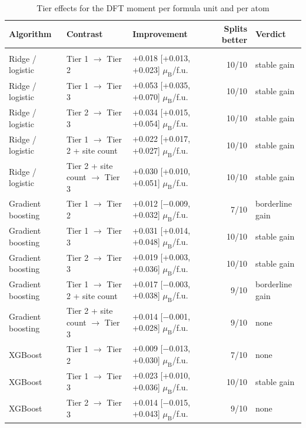 \begin{table}
\caption{Tier effects for the DFT moment per formula unit and per atom}
\label{tab:tableS8_moment_per_fu}
\tablefont
\begin{tabularx}{\textwidth}{@{}>{\raggedright\arraybackslash}Xllrl@{}}
\toprule
\textbf{Algorithm} & \textbf{Contrast} & \textbf{Improvement} & \textbf{Splits better} & \textbf{Verdict} \\
\midrule
\multicolumn{5}{@{}l@{}}{\textit{per formula unit, all}} \\
\quad Ridge / logistic & Tier 1 $\rightarrow$ Tier 2 & +0.018 [+0.013, +0.023] $\mu_\mathrm{B}$/f.u. & 10/10 & stable gain \\
\quad Ridge / logistic & Tier 1 $\rightarrow$ Tier 3 & +0.053 [+0.035, +0.070] $\mu_\mathrm{B}$/f.u. & 10/10 & stable gain \\
\quad Ridge / logistic & Tier 2 $\rightarrow$ Tier 3 & +0.034 [+0.015, +0.054] $\mu_\mathrm{B}$/f.u. & 10/10 & stable gain \\
\quad Ridge / logistic & Tier 1 $\rightarrow$ Tier 2 + site count & +0.022 [+0.017, +0.027] $\mu_\mathrm{B}$/f.u. & 10/10 & stable gain \\
\quad Ridge / logistic & Tier 2 + site count $\rightarrow$ Tier 3 & +0.030 [+0.010, +0.051] $\mu_\mathrm{B}$/f.u. & 10/10 & stable gain \\
\quad Gradient boosting & Tier 1 $\rightarrow$ Tier 2 & +0.012 [$-$0.009, +0.032] $\mu_\mathrm{B}$/f.u. & 7/10 & borderline gain \\
\quad Gradient boosting & Tier 1 $\rightarrow$ Tier 3 & +0.031 [+0.014, +0.048] $\mu_\mathrm{B}$/f.u. & 10/10 & stable gain \\
\quad Gradient boosting & Tier 2 $\rightarrow$ Tier 3 & +0.019 [+0.003, +0.036] $\mu_\mathrm{B}$/f.u. & 10/10 & stable gain \\
\quad Gradient boosting & Tier 1 $\rightarrow$ Tier 2 + site count & +0.017 [$-$0.003, +0.038] $\mu_\mathrm{B}$/f.u. & 9/10 & borderline gain \\
\quad Gradient boosting & Tier 2 + site count $\rightarrow$ Tier 3 & +0.014 [$-$0.001, +0.028] $\mu_\mathrm{B}$/f.u. & 9/10 & none \\
\quad XGBoost & Tier 1 $\rightarrow$ Tier 2 & +0.009 [$-$0.013, +0.030] $\mu_\mathrm{B}$/f.u. & 7/10 & none \\
\quad XGBoost & Tier 1 $\rightarrow$ Tier 3 & +0.023 [+0.010, +0.036] $\mu_\mathrm{B}$/f.u. & 10/10 & stable gain \\
\quad XGBoost & Tier 2 $\rightarrow$ Tier 3 & +0.014 [$-$0.015, +0.043] $\mu_\mathrm{B}$/f.u. & 9/10 & none \\

\end{tabularx}
\end{table}
